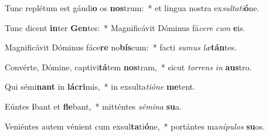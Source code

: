 \item Tunc replétum est gáudi\textbf{o} os \textbf{nos}trum:~* et lingua nostra ex\textit{sul}\textit{ta}\textit{ti}\textbf{ó}ne.
\item Tunc dicent \textbf{in}ter \textbf{Gen}tes:~* Magnificávit Dóminus fá\textit{ce}\textit{re} \textit{cum} \textbf{e}is.
\item Magnificávit Dóminus fáce\textbf{re} no\textbf{bís}cum:~* facti \textit{su}\textit{mus} \textit{læ}\textbf{tán}tes.
\item Convérte, Dómine, captivi\textbf{tá}tem \textbf{nos}tram,~* sicut \textit{tor}\textit{rens} \textit{in} \textbf{aus}tro.
\item Qui sémi\textbf{nant} in \textbf{lá}\textbf{cri}mis,~* in exsulta\textit{ti}\textit{ó}\textit{ne} \textbf{me}tent.
\item Eúntes \textbf{i}bant et \textbf{fle}bant,~* mitténtes \textit{sé}\textit{mi}\textit{na} \textbf{su}a.
\item Veniéntes autem vénient cum exsul\textbf{ta}ti\textbf{ó}ne,~* portántes ma\textit{ní}\textit{pu}\textit{los} \textbf{su}os.
